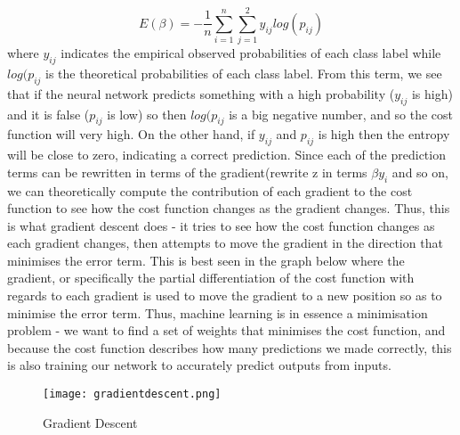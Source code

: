 \documentclass{article}
\begin{document}
\begin{equation}
E(\beta) = - \frac{1}{n}\sum_{i=1}^{n}{\sum_{j=1}^{2}y_{ij}log(p_{ij})}
\end{equation} 
where $y_{ij}$ indicates the empirical observed probabilities of each class label while $log(p_{ij}$ is the theoretical probabilities of each class label. From this term, we see that if the neural network predicts something with a high probability ($y_{ij}$ is high) and it is false ($p_{ij}$ is low) so then $log(p_{ij}$ is a big negative number, and so the cost function will very high. On the other hand, if $y_{ij}$ and $p_{ij}$ is high then the entropy will be close to zero, indicating a correct prediction. Since each of the prediction terms can be rewritten in terms of the gradient(rewrite z in terms $\beta y_i $ and so on, we can theoretically compute the contribution of each gradient to the cost function to see how the cost function changes as the gradient changes. Thus, this is what gradient descent does - it tries to see how the cost function changes as each gradient changes, then attempts to move the gradient in the direction that minimises the error term. This is best seen in the graph below  where the gradient, or specifically the partial differentiation of the cost function with regards to each gradient is used to move the gradient to a new position so as to minimise the error term. Thus, machine learning is in essence a minimisation problem - we want to find a set of weights that minimises the cost function, and because the cost function describes how many predictions we made correctly, this is also training our network to accurately predict outputs from inputs.
\begin{figure}[H]
\texttt{[image: gradientdescent.png]}
\caption{Gradient Descent}
\centering
\end{figure}
\newpage
\end{document}

